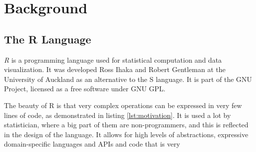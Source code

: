 \chapter{Background}

\begin{chapterabstract}
	\todoadd
\end{chapterabstract}

\section{The R Language}

\textit{R}\cite{r} is a programming language used for statistical computation and data visualization. It was developed Ross Ihaka and Robert Gentleman at the University of Auckland as an alternative to the S language. It is part of the GNU Project, licensed as a free software under GNU GPL.

The beauty of R is that very complex operations can be expressed in very few lines of code, as demonstrated in listing \ref{lst:motivation}. It is used a lot by statistician, where a big part of them are non-programmers, and this is reflected in the design of the language. It allows for high levels of abstractions, expressive domain-specific languages and APIs and code that is very \todoadd

